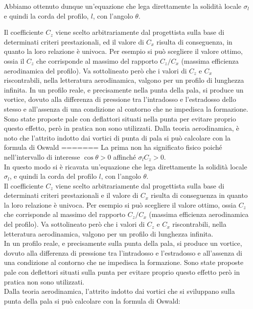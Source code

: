 Abbiamo ottenuto dunque un'equazione che lega direttamente la solidità locale $\sigma_l$ e quindi la corda del profilo, $l$, con l'angolo $\theta$.

Il coefficiente $C_z$ viene scelto arbitrariamente dal progettista sulla base di determinati criteri prestazionali, ed il valore di $C_x$ risulta di conseguenza, in quanto la loro relazione è univoca. Per esempio si può scegliere il valore ottimo, ossia il $C_z$ che corrisponde al massimo del rapporto $C_z/C_x$ (massima efficienza aerodinamica del profilo). Va sottolineato però che i valori di $C_z$ e $C_x$ riscontrabili, nella letteratura aerodinamica, valgono per un profilo di lunghezza infinita. In un profilo reale, e precisamente nella punta della pala, si produce un vortice, dovuto alla differenza di pressione tra l'intradosso e l'estradosso dello stesso e all'assenza di una condizione al contorno che ne impedisca la formazione. Sono state proposte pale con deflattori situati nella punta per evitare proprio questo effetto, però in pratica non sono utilizzati. Dalla teoria aerodinamica, è noto che l'attrito indotto dai vortici di punta di pala si può calcolare con la formula di Oswald
=======
La prima non ha significato fisico poiché nell'intervallo di interesse $\cos \theta > 0 $ affinché $\sigma_l C_z > 0$.\\
In questo modo si è ricavata un'equazione che lega direttamente la solidità locale $\sigma_l$, e quindi la corda del profilo $l$, con l'angolo $\theta$.\\
Il coefficiente $C_z$ viene scelto arbitrariamente dal progettista sulla base di determinati criteri prestazionali e il valore di $C_x$ risulta di conseguenza in quanto la loro relazione è univoca. Per esempio si può scegliere il valore ottimo, ossia $C_z$ che corrisponde al massimo del rapporto $C_z/C_x$ (massima efficienza aerodinamica del profilo). Va sottolineato però che i valori di $C_z$ e $C_x$ riscontrabili, nella letteratura aerodinamica, valgono per un profilo di lunghezza infinita.\\
In un profilo reale, e precisamente sulla punta della pala, si produce un vortice, dovuto alla differenza di pressione tra l'intradosso e l'estradosso e all'assenza di una condizione al contorno che ne impedisca la formazione. Sono state proposte pale con deflettori situati sulla punta per evitare proprio questo effetto però in pratica non sono utilizzati.\\
Dalla teoria aerodinamica, l'attrito indotto dai vortici che si sviluppano sulla punta della pala si può calcolare con la formula di Oswald:
